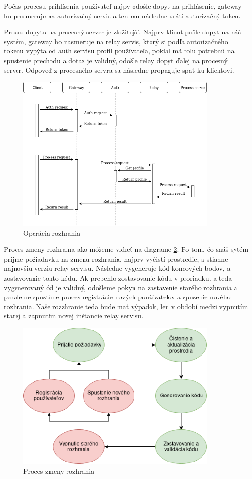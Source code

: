 Počas procesu prihlísenia používateľ najpv odošle dopyt na prihlásenie, gateway ho presmeruje na autorizačný servis a ten mu následne vráti autorizačný token.

Proces dopytu na procesný server je zložitejší. Najprv klient pošle dopyt na náš systém, gateway ho nasmeruje na relay servis, ktorý si podľa autorizačného tokenu vypýta od auth servisu profil používateľa, pokial má rolu potrebnú na spustenie prechodu a dotaz je validný, odošle relay dopyt ďalej na procesný server. Odpoveď z procesného servra sa následne propaguje spať ku klientovi.
 
\begin{figure}[!htbp] 
	\centering 
	\includegraphics[width=10cm]{img/api_operation.png} 
	\caption{Operácia rozhrania} 
	\label{api_operation} 
\end{figure}


Proces zmeny rozhrania ako môžeme vidieť na diagrame \ref{change_operation}.
Po tom, čo snáš sytém prijme požiadavku na zmenu rozhrania, najprv vyčistí prostredie, a stiahne najnovšiu verziu relay servisu. Následne vygeneruje kód koncových bodov, a zostavovanie tohto kódu. Ak prebehlo zostavovanie kódu v proriadku, a teda vygenerovaný ód je validný, odošleme pokyn na zastavenie starého rozhrania a paralelne spustíme proces registrácie nových používateľov a spusenie nového rozhrania. Naše rozzhranie teda bude mať výpadok, len v období medzi vypnutím starej a zapnutím novej inštancie relay servisu.

\begin{figure}[!htbp] 
	\centering 
	\includegraphics[width=10cm]{img/change_operation.png} 
	\caption{Proces zmeny rozhrania} 
	\label{change_operation} 
\end{figure}

